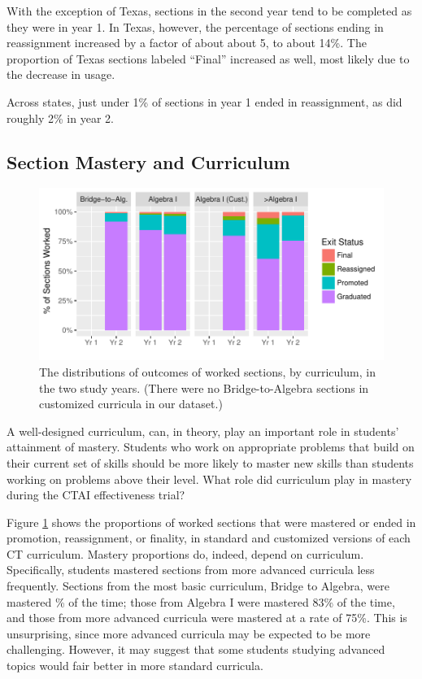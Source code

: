 \documentclass[12pt]{article}\usepackage[]{graphicx}\usepackage[]{color}
\makeatletter
\def\maxwidth{ %
  \ifdim\Gin@nat@width>\linewidth
    \linewidth
  \else
    \Gin@nat@width
  \fi
}
\makeatother
\begin{document}
With the exception of Texas, sections in the second year tend to be
completed as they were in year 1.
In Texas, however, the percentage of sections ending in reassignment increased by a factor
of about about
5,
to about 14\%.
The proportion of Texas sections labeled ``Final'' increased as well,
most likely due to the decrease in usage.

Across states, just under
1\% of sections in year
1 ended in reassignment, as did roughly
2\% in year 2.

\subsection{Section Mastery and Curriculum}
\begin{figure}
  \centering

\includegraphics[width=\maxwidth]{figure/statusCur-1} 

\caption{The distributions of outcomes of worked sections, by
  curriculum, in the two study years. (There were no Bridge-to-Algebra
sections in customized curricula in our dataset.)}
\label{fig:statusCur}
\end{figure}

A well-designed curriculum, can, in theory, play an important role in
students' attainment of mastery.
Students who work on appropriate problems that build on their current
set of skills should be more likely to master new skills than students
working on problems above their level.
What role did curriculum play in mastery during the CTAI effectiveness trial?

Figure \ref{fig:statusCur} shows the proportions of worked sections
that were mastered or ended in promotion, reassignment, or finality, in
standard and customized versions of each CT curriculum.
Mastery proportions do, indeed, depend on curriculum.
Specifically, students mastered sections from more advanced curricula
less frequently.
Sections from the most basic curriculum, Bridge to Algebra, were
mastered
\% of the time;
those from Algebra I were mastered
83\%
of the time, and those from more advanced curricula were mastered
at a rate of
75\%.
This is unsurprising, since more advanced curricula may be expected
to be more challenging.
However, it may suggest that some students studying advanced topics
would fair better in more standard curricula.
\end{document}
